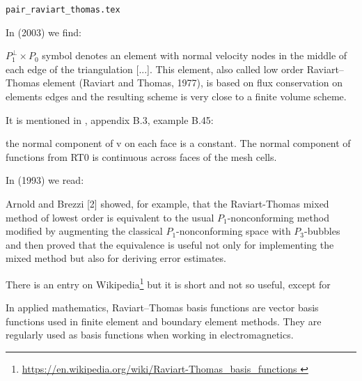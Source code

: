 \begin{flushright} {\tiny {\color{gray} \tt pair\_raviart\_thomas.tex}} \end{flushright}
 
In \textcite{hald03} (2003) we find: 
\begin{displayquote}
{\color{darkgray}
$P_1^\perp \times P_0$ symbol denotes an element with 
normal velocity nodes in the middle of each edge of the
triangulation [...]. This element, also called low order Raviart–Thomas element 
(Raviart and Thomas, 1977), is based on flux conservation on elements edges and 
the resulting scheme is very close to a finite volume scheme.
}
\end{displayquote}

It is mentioned in \textcite{john16}, appendix B.3, example B.45: 
\begin{displayquote}
{\color{darkgray}
the normal component of v 
on each face is a constant. The normal component of functions from RT0 is
continuous across faces of the mesh cells.
}
\end{displayquote}


In \textcite{chen93a} (1993) we read:
\begin{displayquote}
{\color{darkgray}
Arnold and Brezzi [2] showed, for
example, that the Raviart-Thomas mixed method of lowest order is
equivalent to the usual $P_1$-nonconforming method modified by augmenting
the classical $P_1$-nonconforming space with $P_3$-bubbles and then proved that
the equivalence is useful not only for implementing the mixed method but
also for deriving error estimates.
}
\end{displayquote}


There is an entry on Wikipedia\footnote{\url{
https://en.wikipedia.org/wiki/Raviart-Thomas_basis_functions
}} but it is short and not so useful, except for
\begin{displayquote}
{\color{darkgray}
In applied mathematics, Raviart–Thomas basis functions are vector basis functions used 
in finite element and boundary element methods. They are regularly used as basis 
functions when working in electromagnetics. 
}
\end{displayquote}

